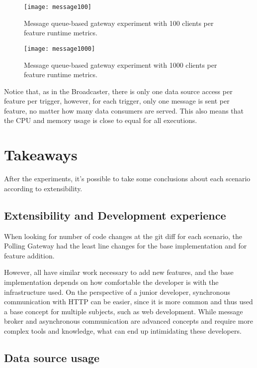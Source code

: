 \begin{figure}
    \centering
    \texttt{[image: message100]}
    \caption{Message queue-based gateway experiment with 100 clients per feature runtime metrics.\label{fig:message100}}
\end{figure}

\begin{figure}
    \centering
    \texttt{[image: message1000]}
    \caption{Message queue-based gateway experiment with 1000 clients per feature runtime metrics.\label{fig:message1000}}
\end{figure}

Notice that, as in the Broadcaster, there is only one data source access per feature per trigger, however, for each trigger, only one message is sent per feature, no matter how many data consumers are served. This also means that the CPU and memory usage is close to equal for all executions.

\section{Takeaways}
\label{sec:providerconclusion}

After the experiments, it's possible to take some conclusions about each scenario according to extensibility.

\subsection*{Extensibility and Development experience}
\label{sec:devex}

When looking for number of code changes at the git diff for each scenario, the Polling Gateway had the least line changes for the base implementation and for feature addition.

However, all have similar work necessary to add new features, and the base implementation depends on how comfortable the developer is with the infrastructure used. On the perspective of a junior developer, synchronous communication with HTTP can be easier, since it is more common and thus used a base concept for multiple subjects, such as web development. While message broker and asynchronous communication are advanced concepts and require more complex tools and knowledge, what can end up intimidating these developers.

\subsection*{Data source usage}
\label{sec:source}

